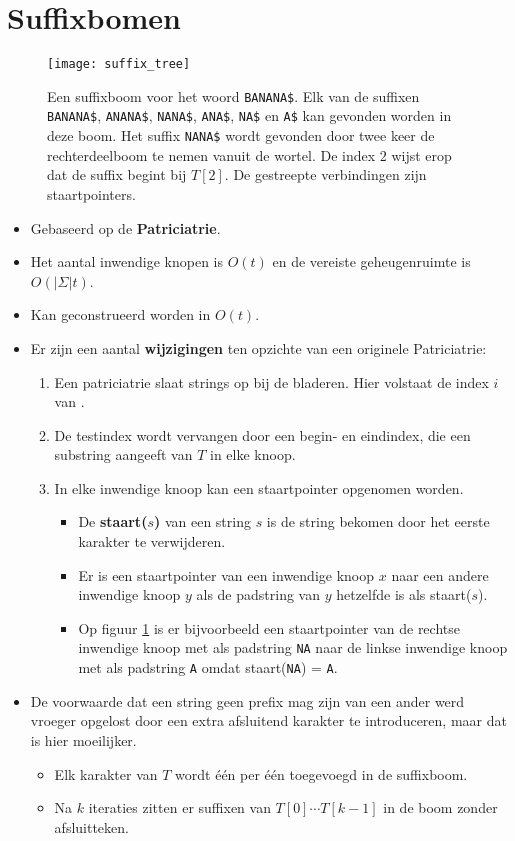\section{Suffixbomen}
\begin{figure}[ht]
    \centering
    \texttt{[image: suffix\_tree]}
    \caption{Een suffixboom voor het woord \texttt{BANANA\$}. Elk van de suffixen \texttt{BANANA\$}, \texttt{ANANA\$}, \texttt{NANA\$}, \texttt{ANA\$}, \texttt{NA\$} en \texttt{A\$} kan gevonden worden in deze boom. Het suffix \texttt{NANA\$} wordt gevonden door twee keer de rechterdeelboom te nemen vanuit de wortel. De index $2$ wijst erop dat de suffix begint bij $T[2]$. De gestreepte verbindingen zijn staartpointers.}
    \label{fig:suffix_tree}
\end{figure}
\begin{itemize}
    \item Gebaseerd op de  \textbf{Patriciatrie}.
    \item Het aantal inwendige knopen is $O(t)$ en de vereiste geheugenruimte is $O(|\Sigma|t)$.
    \item Kan geconstrueerd worden in $O(t)$.
    \item Er zijn een aantal \textbf{wijzigingen} ten opzichte van een originele Patriciatrie:
    \begin{enumerate}
        \item Een patriciatrie slaat strings op bij de bladeren. Hier volstaat de index $i$ van .
        \item De testindex wordt vervangen door een begin- en eindindex, die een substring aangeeft van $T$ in elke knoop. 
        \item In elke inwendige knoop kan een staartpointer opgenomen worden.
        \begin{itemize}
            \item De \textbf{staart($s$)} van een string $s$ is de string bekomen door het eerste karakter te verwijderen.
            \item Er is een staartpointer van een inwendige knoop $x$ naar een andere inwendige knoop $y$ als de padstring van $y$ hetzelfde is als staart($s$).
            \item Op figuur \ref{fig:suffix_tree} is er bijvoorbeeld een staartpointer van de rechtse inwendige knoop met als padstring \texttt{NA} naar de linkse inwendige knoop met als padstring \texttt{A} omdat staart(\texttt{NA}) = \texttt{A}.
        \end{itemize}
    \end{enumerate}
    \item De voorwaarde dat een string geen prefix mag zijn van een ander werd vroeger opgelost door een extra afsluitend karakter te introduceren, maar dat is hier moeilijker.
    \begin{itemize}
        \item Elk karakter van $T$ wordt één per één toegevoegd in de suffixboom.
        \item Na $k$ iteraties zitten er suffixen van $T[0]\cdots T[k-1]$ in de boom zonder afsluitteken.



\end{itemize}
\end{itemize}

